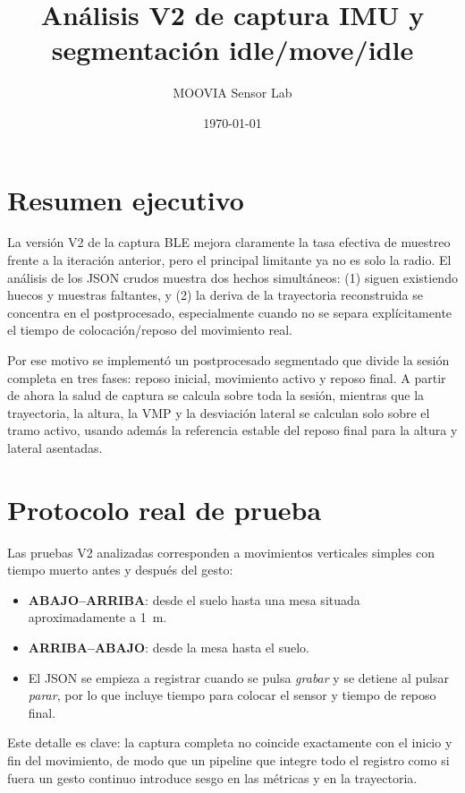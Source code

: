 ﻿\documentclass[11pt,a4paper]{article}
\title{An\'alisis V2 de captura IMU y segmentaci\'on idle/move/idle}
\author{MOOVIA Sensor Lab}
\date{\today}
\begin{document}
\maketitle

\section*{Resumen ejecutivo}
La versi\'on V2 de la captura BLE mejora claramente la tasa efectiva de muestreo frente a la iteraci\'on anterior, pero el principal limitante ya no es solo la radio. El an\'alisis de los JSON crudos muestra dos hechos simult\'aneos: (1) siguen existiendo huecos y muestras faltantes, y (2) la deriva de la trayectoria reconstruida se concentra en el postprocesado, especialmente cuando no se separa expl\'icitamente el tiempo de colocaci\'on/reposo del movimiento real.

Por ese motivo se implement\'o un postprocesado segmentado que divide la sesi\'on completa en tres fases: reposo inicial, movimiento activo y reposo final. A partir de ahora la salud de captura se calcula sobre toda la sesi\'on, mientras que la trayectoria, la altura, la VMP y la desviaci\'on lateral se calculan solo sobre el tramo activo, usando adem\'as la referencia estable del reposo final para la altura y lateral asentadas.

\section{Protocolo real de prueba}
Las pruebas V2 analizadas corresponden a movimientos verticales simples con tiempo muerto antes y despu\'es del gesto:
\begin{itemize}[leftmargin=14pt]
  \item \textbf{ABAJO--ARRIBA}: desde el suelo hasta una mesa situada aproximadamente a \SI{1}{m}.
  \item \textbf{ARRIBA--ABAJO}: desde la mesa hasta el suelo.
  \item El JSON se empieza a registrar cuando se pulsa \emph{grabar} y se detiene al pulsar \emph{parar}, por lo que incluye tiempo para colocar el sensor y tiempo de reposo final.
\end{itemize}

Este detalle es clave: la captura completa no coincide exactamente con el inicio y fin del movimiento, de modo que un pipeline que integre todo el registro como si fuera un gesto continuo introduce sesgo en las m\'etricas y en la trayectoria.
\end{document}
